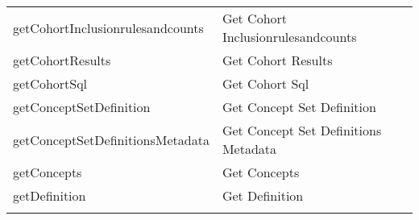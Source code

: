 \documentclass[
]{article}
\begin{document}
\begin{longtable}[]{@{}ll@{}}
\begin{minipage}[t]{0.46\columnwidth}\raggedright
getCohortInclusionrulesandcounts\strut
\end{minipage} & \begin{minipage}[t]{0.48\columnwidth}\raggedright
Get Cohort Inclusionrulesandcounts\strut
\end{minipage}\tabularnewline
\begin{minipage}[t]{0.46\columnwidth}\raggedright
getCohortResults\strut
\end{minipage} & \begin{minipage}[t]{0.48\columnwidth}\raggedright
Get Cohort Results\strut
\end{minipage}\tabularnewline
\begin{minipage}[t]{0.46\columnwidth}\raggedright
getCohortSql\strut
\end{minipage} & \begin{minipage}[t]{0.48\columnwidth}\raggedright
Get Cohort Sql\strut
\end{minipage}\tabularnewline
\begin{minipage}[t]{0.46\columnwidth}\raggedright
getConceptSetDefinition\strut
\end{minipage} & \begin{minipage}[t]{0.48\columnwidth}\raggedright
Get Concept Set Definition\strut
\end{minipage}\tabularnewline
\begin{minipage}[t]{0.46\columnwidth}\raggedright
getConceptSetDefinitionsMetadata\strut
\end{minipage} & \begin{minipage}[t]{0.48\columnwidth}\raggedright
Get Concept Set Definitions Metadata\strut
\end{minipage}\tabularnewline
\begin{minipage}[t]{0.46\columnwidth}\raggedright
getConcepts\strut
\end{minipage} & \begin{minipage}[t]{0.48\columnwidth}\raggedright
Get Concepts\strut
\end{minipage}\tabularnewline
\begin{minipage}[t]{0.46\columnwidth}\raggedright
getDefinition\strut
\end{minipage} & \begin{minipage}[t]{0.48\columnwidth}\raggedright
Get Definition\strut
\end{minipage}\tabularnewline
\begin{minipage}[t]{0.46\columnwidth}\raggedright

\end{minipage}
\end{longtable}
\end{document}
